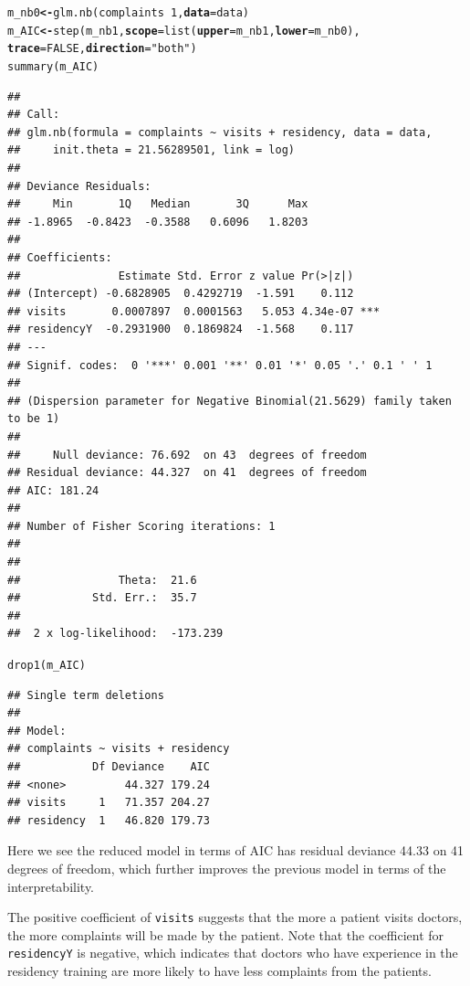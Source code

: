 \documentclass[12pt,oneside,a4paper]{article}\usepackage[]{graphicx}\usepackage[]{xcolor}
\makeatletter
\newcommand{\hlnum}[1]{\textcolor[rgb]{0,0,0}{#1}}%
\newcommand{\hlstr}[1]{\textcolor[rgb]{0,0,1}{#1}}%
\newcommand{\hlopt}[1]{\textcolor[rgb]{0,0,0}{#1}}%
\newcommand{\hlstd}[1]{\textcolor[rgb]{0,0,0}{#1}}%
\newcommand{\hlkwb}[1]{\textcolor[rgb]{0.498,0,0.333}{\textbf{#1}}}%
\newcommand{\hlkwc}[1]{\textcolor[rgb]{0.498,0,0.333}{\textbf{#1}}}%
\newcommand{\hlkwd}[1]{\textcolor[rgb]{0,0,0}{#1}}%
\newenvironment{kframe}{%
 \def\at@end@of@kframe{}%
 \ifinner\ifhmode%
  \def\at@end@of@kframe{\end{minipage}}%
  \begin{minipage}{\columnwidth}%
 \fi\fi%
 \def\FrameCommand##1{\hskip\@totalleftmargin \hskip-\fboxsep
 \colorbox{shadecolor}{##1}\hskip-\fboxsep
     \hskip-\linewidth \hskip-\@totalleftmargin \hskip\columnwidth}%
 \MakeFramed {\advance\hsize-\width
   \@totalleftmargin\z@ \linewidth\hsize
   \@setminipage}}%
 {\par\unskip\endMakeFramed%
 \at@end@of@kframe}
\newenvironment{knitrout}{}{} %
\newcommand{\m}[1]{\texttt{{#1}}}
\makeatother
\begin{document}
\begin{knitrout}
\color{fgcolor}\begin{kframe}
\begin{alltt}
\hlstd{m_nb0} \hlkwb{<-} \hlkwd{glm.nb}\hlstd{(complaints} \hlopt{~} \hlnum{1}\hlstd{,} \hlkwc{data} \hlstd{= data)}
\hlstd{m_AIC} \hlkwb{<-} \hlkwd{step}\hlstd{(m_nb1,} \hlkwc{scope} \hlstd{=} \hlkwd{list}\hlstd{(}\hlkwc{upper} \hlstd{= m_nb1,} \hlkwc{lower} \hlstd{= m_nb0),}
              \hlkwc{trace} \hlstd{=} \hlnum{FALSE}\hlstd{,} \hlkwc{direction} \hlstd{=} \hlstr{"both"}\hlstd{)}
\hlkwd{summary}\hlstd{(m_AIC)}
\end{alltt}
\begin{verbatim}
## 
## Call:
## glm.nb(formula = complaints ~ visits + residency, data = data, 
##     init.theta = 21.56289501, link = log)
## 
## Deviance Residuals: 
##     Min       1Q   Median       3Q      Max  
## -1.8965  -0.8423  -0.3588   0.6096   1.8203  
## 
## Coefficients:
##               Estimate Std. Error z value Pr(>|z|)    
## (Intercept) -0.6828905  0.4292719  -1.591    0.112    
## visits       0.0007897  0.0001563   5.053 4.34e-07 ***
## residencyY  -0.2931900  0.1869824  -1.568    0.117    
## ---
## Signif. codes:  0 '***' 0.001 '**' 0.01 '*' 0.05 '.' 0.1 ' ' 1
## 
## (Dispersion parameter for Negative Binomial(21.5629) family taken to be 1)
## 
##     Null deviance: 76.692  on 43  degrees of freedom
## Residual deviance: 44.327  on 41  degrees of freedom
## AIC: 181.24
## 
## Number of Fisher Scoring iterations: 1
## 
## 
##               Theta:  21.6 
##           Std. Err.:  35.7 
## 
##  2 x log-likelihood:  -173.239
\end{verbatim}
\begin{alltt}
\hlkwd{drop1}\hlstd{(m_AIC)}
\end{alltt}
\begin{verbatim}
## Single term deletions
## 
## Model:
## complaints ~ visits + residency
##           Df Deviance    AIC
## <none>         44.327 179.24
## visits     1   71.357 204.27
## residency  1   46.820 179.73
\end{verbatim}
\end{kframe}
\end{knitrout}

Here we see the reduced model in terms of AIC has residual deviance 44.33 on 41 degrees of freedom, which further improves the previous model in terms of the interpretability. 

The positive coefficient of \m{visits} suggests that the more a patient visits doctors, the more complaints will be made by the patient. Note that the coefficient for \m{residencyY} is negative, which indicates that doctors who have experience in the residency training are more likely to have less complaints from the patients.
\end{document}
